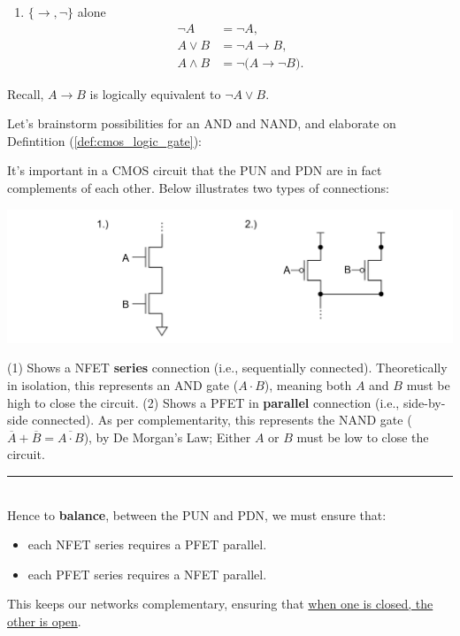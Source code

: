 \begin{Example}
\begin{enumerate}
  \item $\{\to,\neg\}$ alone
    \begin{align*}
      \neg A   &= \neg A,\\
      A\lor B  &= \neg A \to B,\\
      A\land B &= \neg\bigl(A \to \neg B\bigr).
    \end{align*}
\end{enumerate}

\noindent
Recall, $A \to B$ is logically equivalent to $\neg A \lor B$. 
\end{Example}

\newpage 

\noindent
Let's brainstorm possibilities for an AND and NAND, and elaborate on Defintition (\ref{def:cmos_logic_gate}):
\begin{theo}

    \noindent
    It's important in a CMOS circuit that the PUN and PDN are in fact complements of each other. Below
    illustrates two types of connections:

    \begin{center}
      \includegraphics[width=\textwidth]{Sections/circuits/np_comp.png}
    \end{center}

    \noindent
    (1) Shows a NFET \textbf{series} connection (i.e., sequentially connected). Theoretically in isolation, this represents
    an AND gate ($A \cdot B$), meaning both $A$ and $B$ must be high to close the circuit. (2) Shows a PFET in \textbf{parallel} connection (i.e., side-by-side connected). As per complementarity, this represents the NAND gate
    ($\overline{A} + \overline{B} = \overline{A \cdot B}$), by De Morgan's Law; Either $A$ or $B$ must be low to close the circuit.\\
    \rule{\textwidth}{0.4pt}\\
    \noindent
    Hence to \textbf{balance}, between the PUN and PDN, we must ensure that:
    \begin{itemize}
        \item each NFET series requires a PFET parallel.
        \item each PFET series requires a NFET parallel.
    \end{itemize}

    \noindent
    This keeps our networks complementary, ensuring that \underline{when one is closed, the other is open}.
\end{theo}